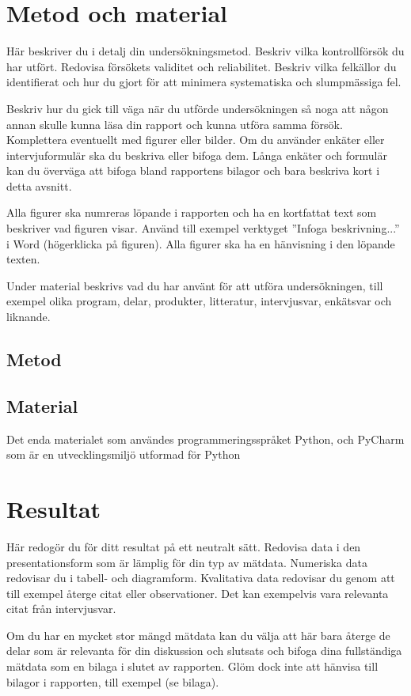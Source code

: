 \documentclass{article}
\begin{document}
\section{Metod och material}
Här beskriver du i detalj din undersökningsmetod. Beskriv vilka kontrollförsök du har utfört. Redovisa försökets validitet och reliabilitet. Beskriv vilka felkällor du identifierat och hur du gjort för att minimera systematiska och slumpmässiga fel.

Beskriv hur du gick till väga när du utförde undersökningen så noga att någon annan skulle kunna läsa din rapport och kunna utföra samma försök. Komplettera eventuellt med figurer eller bilder. Om du använder enkäter eller intervjuformulär ska du beskriva eller bifoga dem. Långa enkäter och formulär kan du överväga att bifoga bland rapportens bilagor och bara beskriva kort i detta avsnitt.

Alla figurer ska numreras löpande i rapporten och ha en kortfattat text som beskriver vad figuren visar. Använd till exempel verktyget ”Infoga beskrivning...” i Word (högerklicka på figuren). Alla figurer ska ha en hänvisning i den löpande texten.

Under material beskrivs vad du har använt för att utföra undersökningen, till exempel olika program, delar, produkter, litteratur, intervjusvar, enkätsvar och liknande.

\subsection{Metod}


\subsection{Material}
Det enda materialet som användes programmeringsspråket Python, och PyCharm som är en utvecklingsmiljö utformad för Python

\section{Resultat}
Här redogör du för ditt resultat på ett neutralt sätt. Redovisa data i den presentationsform som är lämplig för din typ av mätdata. Numeriska data redovisar du i tabell- och diagramform. Kvalitativa data redovisar du genom att till exempel återge citat eller observationer. Det kan exempelvis vara relevanta citat från intervjusvar.

Om du har en mycket stor mängd mätdata kan du välja att här bara återge de delar som är relevanta för din diskussion och slutsats och bifoga dina fullständiga mätdata som en bilaga i slutet av rapporten. Glöm dock inte att hänvisa till bilagor i rapporten, till exempel (se bilaga).
\end{document}
